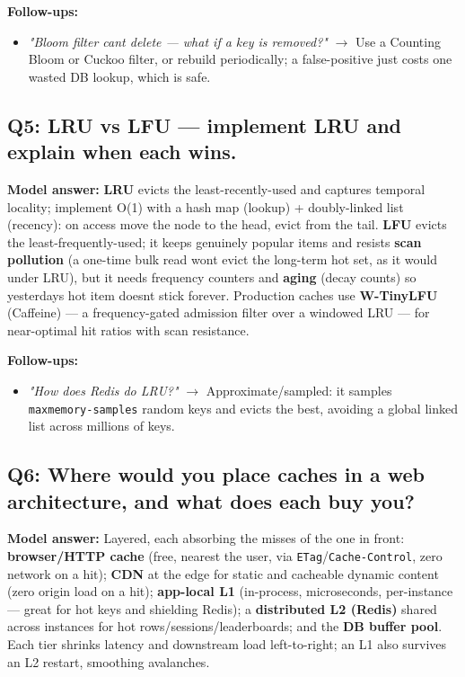 \documentclass[11pt]{article}
\providecommand{\tightlist}{\setlength{\itemsep}{1pt}\setlength{\parskip}{0pt}}
\begin{document}
\textbf{Follow-ups:}

\begin{itemize}
\tightlist
\item
  \emph{"Bloom filter can\textquotesingle t delete --- what if a key is removed?"} \(\rightarrow\) Use a Counting Bloom or Cuckoo filter, or rebuild periodically; a false-positive just costs one wasted DB lookup, which is safe.
\end{itemize}

\subsection{Q5: LRU vs LFU --- implement LRU and explain when each wins.}\label{q5-lru-vs-lfu--implement-lru-and-explain-when-each-wins}

\textbf{Model answer:} \textbf{LRU} evicts the least-recently-used and captures temporal locality; implement O(1) with a hash map (lookup) + doubly-linked list (recency): on access move the node to the head, evict from the tail. \textbf{LFU} evicts the least-frequently-used; it keeps genuinely popular items and resists \textbf{scan pollution} (a one-time bulk read won\textquotesingle t evict the long-term hot set, as it would under LRU), but it needs frequency counters and \textbf{aging} (decay counts) so yesterday\textquotesingle s hot item doesn\textquotesingle t stick forever. Production caches use \textbf{W-TinyLFU} (Caffeine) --- a frequency-gated admission filter over a windowed LRU --- for near-optimal hit ratios with scan resistance.

\textbf{Follow-ups:}

\begin{itemize}
\tightlist
\item
  \emph{"How does Redis do LRU?"} \(\rightarrow\) Approximate/sampled: it samples \texttt{maxmemory-samples} random keys and evicts the best, avoiding a global linked list across millions of keys.
\end{itemize}

\subsection{Q6: Where would you place caches in a web architecture, and what does each buy you?}\label{q6-where-would-you-place-caches-in-a-web-architecture-and-what-does-each-buy-you}

\textbf{Model answer:} Layered, each absorbing the misses of the one in front: \textbf{browser/HTTP cache} (free, nearest the user, via \texttt{ETag}/\texttt{Cache-Control}, zero network on a hit); \textbf{CDN} at the edge for static and cacheable dynamic content (zero origin load on a hit); \textbf{app-local L1} (in-process, microseconds, per-instance --- great for hot keys and shielding Redis); a \textbf{distributed L2 (Redis)} shared across instances for hot rows/sessions/leaderboards; and the \textbf{DB buffer pool}. Each tier shrinks latency and downstream load left-to-right; an L1 also survives an L2 restart, smoothing avalanches.
\end{document}
